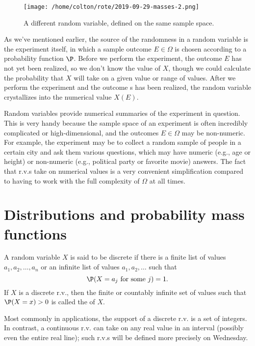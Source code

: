 \documentclass{ccg-topic}
\begin{document}
\begin{figure}[htpb]
    \centering
    \texttt{[image: /home/colton/rote/2019-09-29-masses-2.png]}
    \caption{A different random variable, defined on the same sample space.}
    \label{fig:/home/colton/rote/2019-09-29-masses-2}
\end{figure}

As we've mentioned earlier, the source of the randomness in a random variable is the experiment itself, in which a sample outcome $E \in \Omega$ is chosen according to a probability function $\P$. Before we perform the experiment, the outcome $E$ has not yet been realized, so we don’t know the value of $X$, though we could calculate the probability that $X$ will take on a given value or range of values. After we perform the experiment and the outcome s has been realized, the random variable crystallizes into the numerical value $X(E)$.

Random variables provide numerical summaries of the experiment in question. This is very handy because the sample space of an experiment is often incredibly complicated or high-dimensional, and the outcomes $E \in \Omega$ may be non-numeric. For example, the experiment may be to collect a random sample of people in a certain city and ask them various questions, which may have numeric (e.g., age or height) or non-numeric (e.g., political party or favorite movie) answers. The fact that r.v.s take on numerical values is a very convenient simplification compared to having to work with the full complexity of $\Omega$ at all times. 

\section{Distributions and probability mass functions}

\begin{defn}
    \label{defn:discrete_random_variable}
    A random variable $X$ is said to be discrete if there is a finite list of values $a_1, a_2, \ldots, a_n$ or an infinite list of values $a_1, a_2, \ldots$ such that \[\P(X = a_j \text{ for some } j )=1.\] If $X$ is a discrete r.v., then the finite or countably infinite set of values such that $\P(X = x) > 0$ is called the  of $X$.
\end{defn}

Most commonly in applications, the support of a discrete r.v. is a set of integers. In contrast, a continuous r.v. can take on any real value in an interval (possibly even the entire real line); such r.v.s will be defined more precisely on Wednesday.
\end{document}
